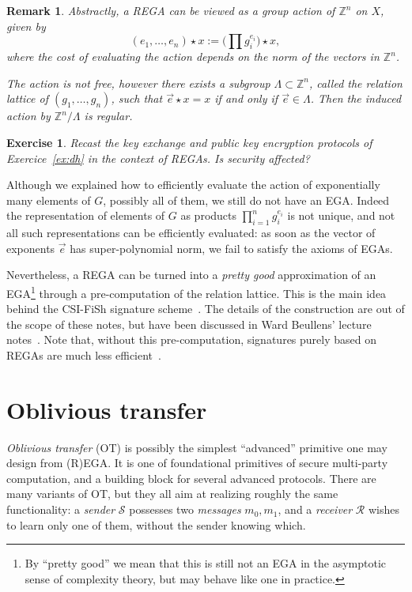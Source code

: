\documentclass{article}
\newtheorem{ex}{Exercise}
\newtheorem{rk}[defi]{Remark}
\def\Z{\mathbb{Z}}
\begin{document}
\begin{rk}
  \label{rk:lattice}
  Abstractly, a REGA can be viewed as a group action of $\Z^n$ on $X$,
  given by
  \begin{equation*}
    (e_1,\ldots,e_n)\star x := \bigl(\prod g_i^{e_i}\bigr)\star x,
  \end{equation*}
  where the cost of evaluating the action depends on the norm of the
  vectors in $\Z^n$.

  The action is not free, however there exists a subgroup
  $\Lambda\subset\Z^n$, called the \emph{relation lattice} of
  $(g_1,\ldots,g_n)$, such that $\vec{e}\star x = x$ if and only if
  $\vec{e}\in\Lambda$.  Then the induced action by $\Z^n/\Lambda$ is
  regular.
\end{rk}

\begin{ex}
  Recast the key exchange and public key encryption protocols of
  Exercice~\ref{ex:dh} in the context of REGAs.  Is security affected?
\end{ex}

Although we explained how to efficiently evaluate the action of
exponentially many elements of $G$, possibly all of them, we still do
not have an EGA.  Indeed the representation of elements of $G$ as
products $\prod_{i=1}^n g_i^{e_i}$ is not unique, and not all such
representations can be efficiently evaluated: as soon as the vector of
exponents $\vec{e}$ has super-polynomial norm, we fail to satisfy the
axioms of EGAs.

Nevertheless, a REGA can be turned into a \emph{pretty good}
approximation of an EGA\footnote{By ``pretty good'' we mean that this
  is still not an EGA in the asymptotic sense of complexity theory,
  but may behave like one in practice.} through a pre-computation of
the relation lattice.  This is the main idea behind the CSI-FiSh
signature scheme~\cite{AC:BeuKleVer19}.  The details of the
construction are out of the scope of these notes, but have been
discussed in Ward Beullens' lecture notes~\cite{ward-ln}.  Note that,
without this pre-computation, signatures purely based on REGAs are
much less efficient~\cite{EC:DeFGal19,PQCRYPTO:DecPanVer19}.


\section{Oblivious transfer}

\emph{Oblivious transfer} (OT) is possibly the simplest ``advanced''
primitive one may design from (R)EGA.  It is one of foundational
primitives of secure multi-party computation, and a building block for
several advanced protocols.  There are many variants of OT, but they
all aim at realizing roughly the same functionality: a \emph{sender}
$\mathcal{S}$ possesses two \emph{messages} $m_0,m_1$, and a
\emph{receiver} $\mathcal{R}$ wishes to learn only one of them,
without the sender knowing which.
\end{document}
